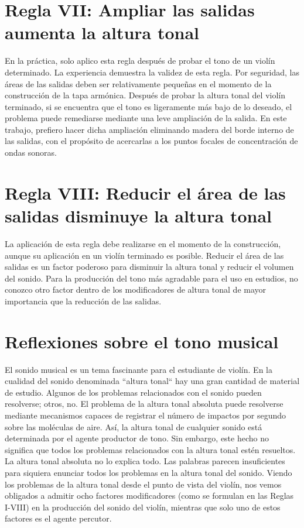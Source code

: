\documentclass[12pt]{book}
\begin{document}
\section*{Regla VII: Ampliar las salidas aumenta la altura tonal}

En la práctica, solo aplico esta regla después de probar el tono de un violín determinado. La experiencia demuestra la validez de esta regla. Por seguridad, las áreas de las salidas deben ser relativamente pequeñas en el momento de la construcción de la tapa armónica. Después de probar la altura tonal del violín terminado, si se encuentra que el tono es ligeramente más bajo de lo deseado, el problema puede remediarse mediante una leve ampliación de la salida. En este trabajo, prefiero hacer dicha ampliación eliminando madera del borde interno de las salidas, con el propósito de acercarlas a los puntos focales de concentración de ondas sonoras.

\section*{Regla VIII: Reducir el área de las salidas disminuye la altura tonal}

La aplicación de esta regla debe realizarse en el momento de la construcción, aunque su aplicación en un violín terminado es posible. Reducir el área de las salidas es un factor poderoso para disminuir la altura tonal y reducir el volumen del sonido. Para la producción del tono más agradable para el uso en estudios, no conozco otro factor dentro de los modificadores de altura tonal de mayor importancia que la reducción de las salidas.

\section*{Reflexiones sobre el tono musical}

El sonido musical es un tema fascinante para el estudiante de violín. En la cualidad del sonido denominada ``altura tonal`` hay una gran cantidad de material de estudio. Algunos de los problemas relacionados con el sonido pueden resolverse; otros, no. El problema de la altura tonal absoluta puede resolverse mediante mecanismos capaces de registrar el número de impactos por segundo sobre las moléculas de aire. Así, la altura tonal de cualquier sonido está determinada por el agente productor de tono. Sin embargo, este hecho no significa que todos los problemas relacionados con la altura tonal estén resueltos. La altura tonal absoluta no lo explica todo. Las palabras parecen insuficientes para siquiera enunciar todos los problemas en la altura tonal del sonido. Viendo los problemas de la altura tonal desde el punto de vista del violín, nos vemos obligados a admitir ocho factores modificadores (como se formulan en las Reglas I-VIII) en la producción del sonido del violín, mientras que solo uno de estos factores es el agente percutor.
\end{document}

